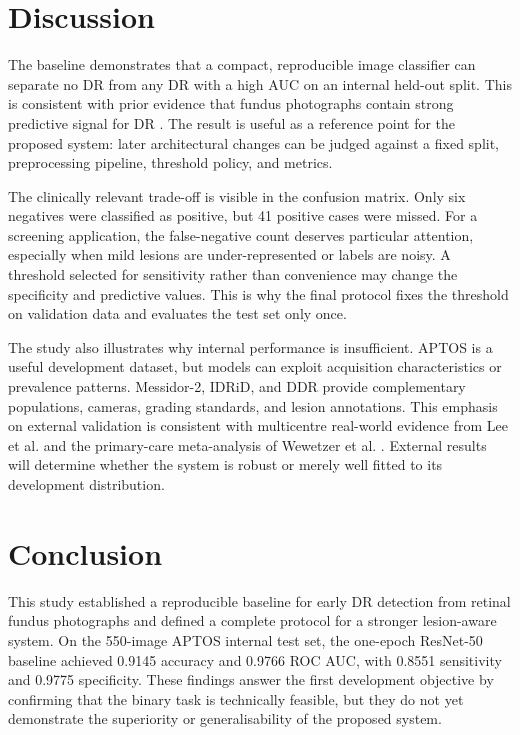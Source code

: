 \documentclass[11pt,a4paper]{article}
\begin{document}
\section{Discussion}
The baseline demonstrates that a compact, reproducible image classifier can separate no DR from any DR with a high AUC on an internal held-out split. This is consistent with prior evidence that fundus photographs contain strong predictive signal for DR \cite{gulshan2016,ting2017}. The result is useful as a reference point for the proposed system: later architectural changes can be judged against a fixed split, preprocessing pipeline, threshold policy, and metrics.

The clinically relevant trade-off is visible in the confusion matrix. Only six negatives were classified as positive, but 41 positive cases were missed. For a screening application, the false-negative count deserves particular attention, especially when mild lesions are under-represented or labels are noisy. A threshold selected for sensitivity rather than convenience may change the specificity and predictive values. This is why the final protocol fixes the threshold on validation data and evaluates the test set only once.

The study also illustrates why internal performance is insufficient. APTOS is a useful development dataset, but models can exploit acquisition characteristics or prevalence patterns. Messidor-2, IDRiD, and DDR provide complementary populations, cameras, grading standards, and lesion annotations. This emphasis on external validation is consistent with multicentre real-world evidence from Lee et al. \cite{lee2021} and the primary-care meta-analysis of Wewetzer et al. \cite{wewetzer2021}. External results will determine whether the system is robust or merely well fitted to its development distribution.

\section{Conclusion}
This study established a reproducible baseline for early DR detection from retinal fundus photographs and defined a complete protocol for a stronger lesion-aware system. On the 550-image APTOS internal test set, the one-epoch ResNet-50 baseline achieved 0.9145 accuracy and 0.9766 ROC AUC, with 0.8551 sensitivity and 0.9775 specificity. These findings answer the first development objective by confirming that the binary task is technically feasible, but they do not yet demonstrate the superiority or generalisability of the proposed system.
\end{document}
